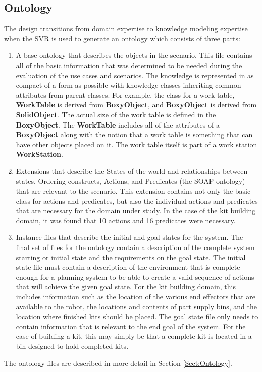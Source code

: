 \subsection{Ontology}
The design transitions from domain expertise to knowledge modeling expertise
when the SVR is used to generate an ontology which consists of three parts:
\begin{enumerate}
 \item A base ontology that describes the objects in the scenario. This file contains
all of the basic information that was determined to be needed during the evaluation of
the use cases and scenarios. The knowledge is represented in as compact of a form as
possible with knowledge classes inheriting common attributes from parent classes. 
For example, the class for a work table, {\bf WorkTable} is derived from
{\bf BoxyObject}, and {\bf BoxyObject} is derived from {\bf SolidObject}. The actual size of the work table
is defined in the {\bf BoxyObject}. The {\bf WorkTable} includes all of the attributes
of a {\bf BoxyObject} along with the notion that a work table is something that can have
other objects placed on it. The work table itself is part of a work station {\bf WorkStation}.
 \item Extensions that describe the States of the world and relationships between states,
Ordering constructs, Actions, and Predicates (the SOAP ontology) 
that are relevant to the scenario. This extension contains not only the basic class for
actions and predicates, but also the individual actions and predicates that are necessary
for the domain under study. In the case of the kit building domain, it was found that
10 actions and 16 predicates were necessary.
 \item Instance files that describe the initial and goal states for the system. The final set
of files for the ontology contain a description of the complete system starting or initial state and the 
requirements on the goal state. The initial state file must contain a description of the environment that
is complete enough for a planning system to be able to create a valid sequence of actions that will achieve
the given goal state. For the kit building domain, this includes information such as the location of the
various end effectors that are available to the robot, the locations and contents of part supply bins, and 
the location where finished kits should be placed. The goal state file only needs to contain information that
is relevant to the end goal of the system. For the case of building a kit, this may simply be that a complete
kit is located in a bin designed to hold completed kits. 
\end{enumerate}
The ontology files are
described in more detail in Section \ref{Sect:Ontology}.

